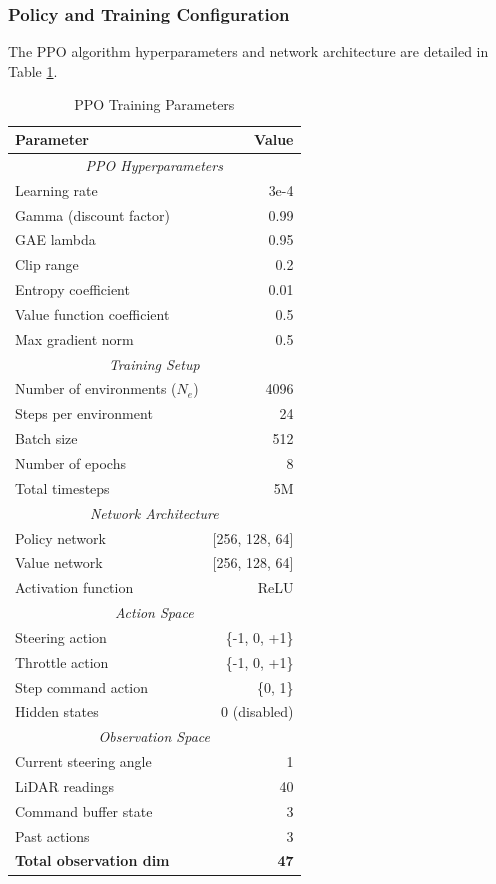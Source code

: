 \documentclass[11pt,a4paper,twocolumn]{article}
\begin{document}
\subsubsection{Policy and Training Configuration}
The PPO algorithm hyperparameters and network architecture are detailed in Table \ref{tab:training_params}.

\begin{table}[h]
\centering
\caption{PPO Training Parameters}
\label{tab:training_params}
\small
\begin{tabular}{|l|r|}
\hline
\textbf{Parameter} & \textbf{Value} \\
\hline
\multicolumn{2}{|c|}{\textit{PPO Hyperparameters}} \\
\hline
Learning rate & 3e-4 \\
Gamma (discount factor) & 0.99 \\
GAE lambda & 0.95 \\
Clip range & 0.2 \\
Entropy coefficient & 0.01 \\
Value function coefficient & 0.5 \\
Max gradient norm & 0.5 \\
\hline
\multicolumn{2}{|c|}{\textit{Training Setup}} \\
\hline
Number of environments ($N_e$) & 4096 \\
Steps per environment & 24 \\
Batch size & 512 \\
Number of epochs & 8 \\
Total timesteps & 5M \\
\hline
\multicolumn{2}{|c|}{\textit{Network Architecture}} \\
\hline
Policy network & [256, 128, 64] \\
Value network & [256, 128, 64] \\
Activation function & ReLU \\
\hline
\multicolumn{2}{|c|}{\textit{Action Space}} \\
\hline
Steering action & \{-1, 0, +1\} \\
Throttle action & \{-1, 0, +1\} \\
Step command action & \{0, 1\} \\
Hidden states & 0 (disabled) \\
\hline
\multicolumn{2}{|c|}{\textit{Observation Space}} \\
\hline
Current steering angle & 1 \\
LiDAR readings & 40 \\
Command buffer state & 3 \\
Past actions & 3 \\
\textbf{Total observation dim} & \textbf{47} \\
\hline
\end{tabular}
\end{table}
\end{document}
